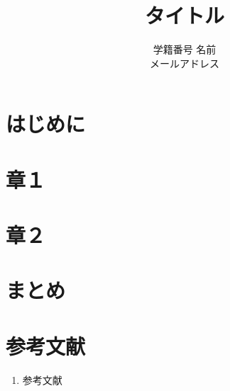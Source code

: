 \documentclass[10.5pt, a4paper, titlepage]{ltjsarticle}
\title{タイトル}
\author{学籍番号 名前 \\ メールアドレス}
\date{}
\makeatletter
\def\mojiparline#1{
\newcounter{mpl}
\setcounter{mpl}{#1}
\@tempdima=\linewidth
\advance\@tempdima by-\value{mpl}zw
\addtocounter{mpl}{-1}
\divide\@tempdima by \value{mpl}
\advance\kanjiskip by\@tempdima
\advance\parindent by\@tempdima
}
\def\linesparpage#1{
\baselineskip=\textheight
\divide\baselineskip by #1
}
\makeatother
\begin{document}
\maketitle
\newpage

\tableofcontents
\clearpage

\section{はじめに}
\section{章１}

\section{章２}

\section{まとめ}
\section*{参考文献}
\begin{enumerate}
    \item 参考文献
\end{enumerate}
\end{document}
